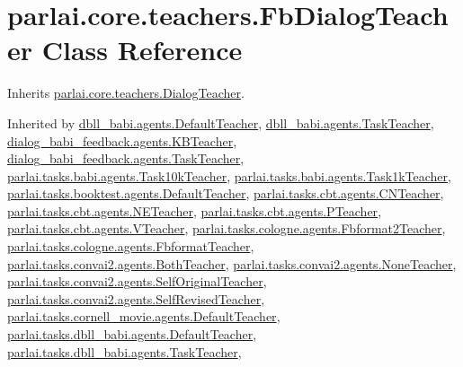 \hypertarget{classparlai_1_1core_1_1teachers_1_1FbDialogTeacher}{}\section{parlai.\+core.\+teachers.\+Fb\+Dialog\+Teacher Class Reference}
\label{classparlai_1_1core_1_1teachers_1_1FbDialogTeacher}


Inherits \hyperlink{classparlai_1_1core_1_1teachers_1_1DialogTeacher}{parlai.\+core.\+teachers.\+Dialog\+Teacher}.



Inherited by \hyperlink{classdbll__babi_1_1agents_1_1DefaultTeacher}{dbll\+\_\+babi.\+agents.\+Default\+Teacher}, \hyperlink{classdbll__babi_1_1agents_1_1TaskTeacher}{dbll\+\_\+babi.\+agents.\+Task\+Teacher}, \hyperlink{classdialog__babi__feedback_1_1agents_1_1KBTeacher}{dialog\+\_\+babi\+\_\+feedback.\+agents.\+K\+B\+Teacher}, \hyperlink{classdialog__babi__feedback_1_1agents_1_1TaskTeacher}{dialog\+\_\+babi\+\_\+feedback.\+agents.\+Task\+Teacher}, \hyperlink{classparlai_1_1tasks_1_1babi_1_1agents_1_1Task10kTeacher}{parlai.\+tasks.\+babi.\+agents.\+Task10k\+Teacher}, \hyperlink{classparlai_1_1tasks_1_1babi_1_1agents_1_1Task1kTeacher}{parlai.\+tasks.\+babi.\+agents.\+Task1k\+Teacher}, \hyperlink{classparlai_1_1tasks_1_1booktest_1_1agents_1_1DefaultTeacher}{parlai.\+tasks.\+booktest.\+agents.\+Default\+Teacher}, \hyperlink{classparlai_1_1tasks_1_1cbt_1_1agents_1_1CNTeacher}{parlai.\+tasks.\+cbt.\+agents.\+C\+N\+Teacher}, \hyperlink{classparlai_1_1tasks_1_1cbt_1_1agents_1_1NETeacher}{parlai.\+tasks.\+cbt.\+agents.\+N\+E\+Teacher}, \hyperlink{classparlai_1_1tasks_1_1cbt_1_1agents_1_1PTeacher}{parlai.\+tasks.\+cbt.\+agents.\+P\+Teacher}, \hyperlink{classparlai_1_1tasks_1_1cbt_1_1agents_1_1VTeacher}{parlai.\+tasks.\+cbt.\+agents.\+V\+Teacher}, \hyperlink{classparlai_1_1tasks_1_1cologne_1_1agents_1_1Fbformat2Teacher}{parlai.\+tasks.\+cologne.\+agents.\+Fbformat2\+Teacher}, \hyperlink{classparlai_1_1tasks_1_1cologne_1_1agents_1_1FbformatTeacher}{parlai.\+tasks.\+cologne.\+agents.\+Fbformat\+Teacher}, \hyperlink{classparlai_1_1tasks_1_1convai2_1_1agents_1_1BothTeacher}{parlai.\+tasks.\+convai2.\+agents.\+Both\+Teacher}, \hyperlink{classparlai_1_1tasks_1_1convai2_1_1agents_1_1NoneTeacher}{parlai.\+tasks.\+convai2.\+agents.\+None\+Teacher}, \hyperlink{classparlai_1_1tasks_1_1convai2_1_1agents_1_1SelfOriginalTeacher}{parlai.\+tasks.\+convai2.\+agents.\+Self\+Original\+Teacher}, \hyperlink{classparlai_1_1tasks_1_1convai2_1_1agents_1_1SelfRevisedTeacher}{parlai.\+tasks.\+convai2.\+agents.\+Self\+Revised\+Teacher}, \hyperlink{classparlai_1_1tasks_1_1cornell__movie_1_1agents_1_1DefaultTeacher}{parlai.\+tasks.\+cornell\+\_\+movie.\+agents.\+Default\+Teacher}, \hyperlink{classparlai_1_1tasks_1_1dbll__babi_1_1agents_1_1DefaultTeacher}{parlai.\+tasks.\+dbll\+\_\+babi.\+agents.\+Default\+Teacher}, \hyperlink{classparlai_1_1tasks_1_1dbll__babi_1_1agents_1_1TaskTeacher}{parlai.\+tasks.\+dbll\+\_\+babi.\+agents.\+Task\+Teacher}, 